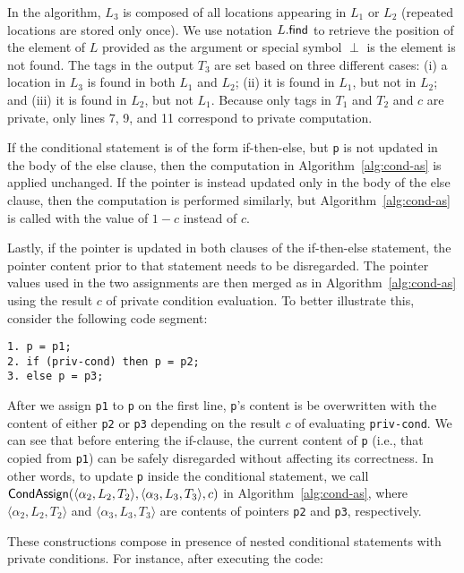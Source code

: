 \documentclass[11pt]{article}
\begin{document}
In the algorithm, $L_3$ is composed of all locations
appearing in $L_1$ or $L_2$ (repeated locations are stored only once).
We use notation $L.{\sf find}$ to retrieve the position of the element
of $L$ provided as the argument or special symbol $\perp$ is the
element is not found. The tags in the output $T_3$ are set based on
three different cases: (i) a location in $L_3$ is found in both $L_1$
and $L_2$; (ii) it is found in $L_1$, but not in $L_2$; and (iii) it
is found in $L_2$, but not $L_1$. Because only tags in $T_1$ and $T_2$
and $c$ are private, only lines 7, 9, and 11 correspond to private
computation.
 
If the conditional statement is of the form if-then-else, but \texttt{p} is
not updated in the body of the else clause, then the computation in
Algorithm~\ref{alg:cond-as} is applied unchanged. If the pointer is instead
updated only in the body of the else clause, then the computation is
performed similarly, but Algorithm~\ref{alg:cond-as} is called with the
value of $1-c$ instead of $c$. 

Lastly, if the pointer is updated in both clauses of the if-then-else
statement, the pointer content prior to that statement needs to be
disregarded. The pointer values used in the two assignments are then merged
as in Algorithm~\ref{alg:cond-as} using the result $c$ of private condition
evaluation. To better illustrate this, consider the following code segment:

{\small \begin{verbatim}
1. p = p1;
2. if (priv-cond) then p = p2;
3. else p = p3;
\end{verbatim}}
\noindent After we assign \texttt{p1} to \texttt{p} on the first line,
\texttt{p}'s content is be overwritten with the content of either
\texttt{p2} or \texttt{p3} depending on the result $c$ of evaluating
\texttt{priv-cond}. We can see that before entering the if-clause, the
current content of \texttt{p} (i.e., that copied from \texttt{p1}) can be
safely disregarded without affecting its correctness. In other words, to
update \texttt{p} inside the conditional statement, we call ${\sf
CondAssign}(\langle \alpha_2, L_2, T_2 \rangle, \langle \alpha_3, L_3, T_3
\rangle, c)$ in Algorithm~\ref{alg:cond-as}, where $\langle \alpha_2, L_2,
T_2 \rangle$ and $\langle \alpha_3, L_3, T_3 \rangle$ are contents of
pointers \texttt{p2} and \texttt{p3}, respectively.

These constructions compose in presence of nested conditional statements with
private conditions. For instance, after executing the code:
\end{document}
